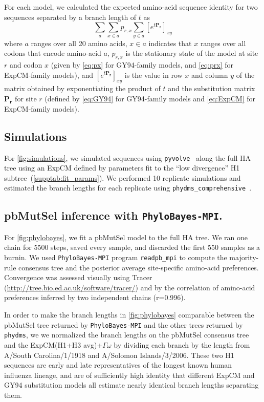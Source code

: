 \documentclass[11pt]{article}
\begin{document}
For each model, we calculated the expected amino-acid sequence identity for two sequences separated by a branch length of $t$ as 
\begin{equation}
\label{eq:f}
\sum_a \sum_{x \in a} p_{r,x} \sum_{y \in a} \left[e^{t\mathbf{P_r}}\right]_{xy}
\end{equation}
where $a$ ranges over all 20 amino acids, $x \in a$ indicates that $x$ ranges over all codons that encode amino-acid $a$, $p_{r,x}$ is the stationary state of the model at site $r$ and codon $x$ (given by \ref{eq:px} for GY94-family models, and \ref{eq:prx} for ExpCM-family models), and $\left[e^{t\mathbf{P_r}}\right]_{xy}$ is the value in row $x$ and column $y$ of the matrix obtained by exponentiating the product of $t$ and the substitution matrix $\mathbf{P_r}$ for site $r$ (defined by \ref{eq:GY94} for GY94-family models and \ref{eq:ExpCM} for ExpCM-family models).

\subsection*{Simulations}
For \ref{fig:simulations}, we simulated sequences using \texttt{pyvolve}~\citep{spielman2015pyvolve} along the full HA tree using an ExpCM defined by parameters fit to the ``low divergence'' H1 subtree~(\ref{supptab:fit_params}). We performed 10 replicate simulations and estimated the branch lengths for each replicate using \texttt{phydms\_comprehensive}~\citep{hilton2017phydms}. 

\subsection*{pbMutSel inference with \texttt{PhyloBayes-MPI}.}
For \ref{fig:phylobayes}, we fit a pbMutSel model to the full HA tree. 
We ran one chain for 5500 steps, saved every sample, and discarded the first 550 samples as a burnin. 
We used \texttt{PhyloBayes-MPI} program \texttt{readpb\_mpi} to compute the majority-rule consensus tree and the posterior average site-specific amino-acid preferences. 
Convergence was assessed visually using Tracer (\url{http://tree.bio.ed.ac.uk/software/tracer/}) and by the correlation of amino-acid preferences inferred by two independent chains (r=0.996). 

In order to make the branch lengths in \ref{fig:phylobayes} comparable between the pbMutSel tree returned by \texttt{PhyloBayes-MPI} and the other trees returned by \texttt{phydms}, we we normalized the branch lengths on the pbMutSel consensus tree and the ExpCM(H1+H3 avg)+$\Gamma\omega$ by dividing each branch by the length from A/South Carolina/1/1918 and A/Solomon Islands/3/2006. 
These two H1 sequences are early and late representatives of the longest known human influenza lineage, and are of sufficiently high identity that different ExpCM and GY94 substitution models all estimate nearly identical branch lengths separating them. 
\end{document}
